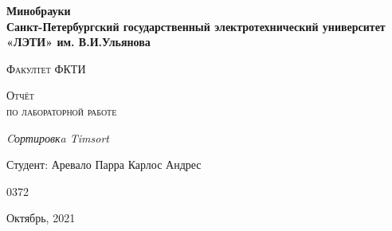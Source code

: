 \begin{titlepage}
  \centering
  {\bfseries\LARGE
  Минобрауки\\
  Санкт-Петербургский государственный электротехнический
  университет «ЛЭТИ» им. В.И.Ульянова \par}
  \vspace{1cm}
  {\scshape\Large Факултет ФКТИ \par}
  \vspace{2.5cm}
  {\scshape\Large Отчёт \\по лабораторной работе\\\par}
  \vspace{1.5cm}
  {\itshape\Large Cортировкa Timsort \par}
  \vfill
  {\Large Студент: Аревало Парра Карлос Андрес \par}
  \vfill
  {\large 0372}
  \vfill
  {\Large Октябрь, 2021 \par}
\end{titlepage}
